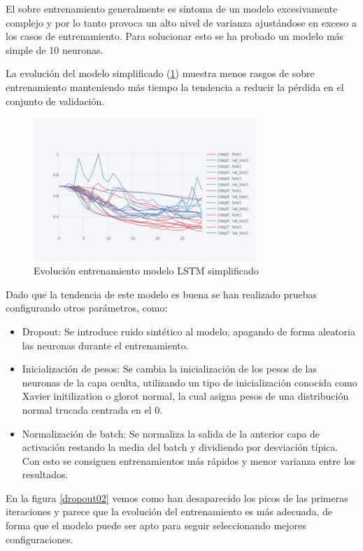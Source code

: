 El sobre entrenamiento generalmente es síntoma de un modelo excesivamente complejo y por lo tanto provoca un alto nivel de varianza ajustándose en exceso a los casos de entrenamiento. Para solucionar esto se ha probado un modelo más simple de 10 neuronas.

La evolución del modelo simplificado (\ref{simple}) muestra menos rasgos de sobre entrenamiento manteniendo más tiempo la tendencia a reducir la pérdida en el conjunto de validación.

\begin{figure}[H]
	\centering
	\includegraphics[width=0.75\textwidth]{imaxes/simple.png}
	\caption{Evolución entrenamiento modelo LSTM simplificado}
	\label{simple}
\end{figure}

Dado que la tendencia de este modelo es buena se han realizado pruebas configurando otros parámetros, como:

\begin{itemize}
	\item Dropout: Se introduce ruido sintético al modelo, apagando de forma aleatoria las neuronas durante el entrenamiento.
	\item Inicialización de pesos: Se cambia la inicialización de los pesos de las neuronas de la capa oculta, utilizando un tipo de inicialización conocida como Xavier initilization \cite{Glorot} o glorot normal, la cual asigna pesos de una distribución normal trucada centrada en el 0.
	\item Normalización de batch: Se normaliza la salida de la anterior capa de activación restando la media del batch y dividiendo por desviación típica. Con esto se consiguen entrenamientos más rápidos y menor varianza entre los resultados.
\end{itemize}

En la figura \ref{dropout02} vemos como han desaparecido los picos de las primeras iteraciones y parece que la evolución del entrenamiento es más adecuada, de forma que el modelo puede ser apto para seguir seleccionando mejores configuraciones.

